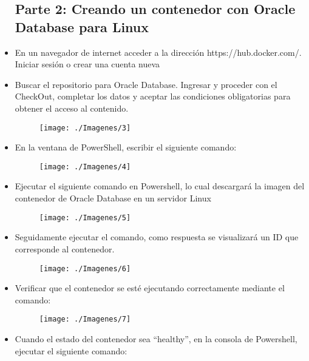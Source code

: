\begin{itemize}
\subsection{Parte 2: Creando un contenedor con Oracle Database para Linux}
	\item En un navegador de internet acceder a la dirección https://hub.docker.com/. Iniciar sesión o crear una cuenta nueva
	\item Buscar el repositorio para Oracle Database. Ingresar y proceder con el CheckOut, completar los datos y aceptar las condiciones obligatorias para obtener el acceso al contenido.
		\begin{figure}[H]
		\begin{center}
		\texttt{[image: ./Imagenes/3]}
		\end{center}
		\end{figure}
	\item En la ventana de PowerShell, escribir el siguiente comando:
		\begin{figure}[H]
		\begin{center}
		\texttt{[image: ./Imagenes/4]}
		\end{center}
		\end{figure}
	\item Ejecutar el siguiente comando en Powershell, lo cual descargará la imagen del contenedor de Oracle Database en un servidor Linux
		\begin{figure}[H]
		\begin{center}
		\texttt{[image: ./Imagenes/5]}
		\end{center}
		\end{figure}
	\item Seguidamente ejecutar el comando, como respuesta se visualizará un ID que corresponde al contenedor.
		\begin{figure}[H]
		\begin{center}
		\texttt{[image: ./Imagenes/6]}
		\end{center}
		\end{figure}
	\item Verificar que el contenedor se esté ejecutando correctamente mediante el comando:
		\begin{figure}[H]
		\begin{center}
		\texttt{[image: ./Imagenes/7]}
		\end{center}
		\end{figure}
	\item Cuando el estado del contenedor sea “healthy”, en la consola de Powershell, ejecutar el siguiente comando:

\end{itemize}
